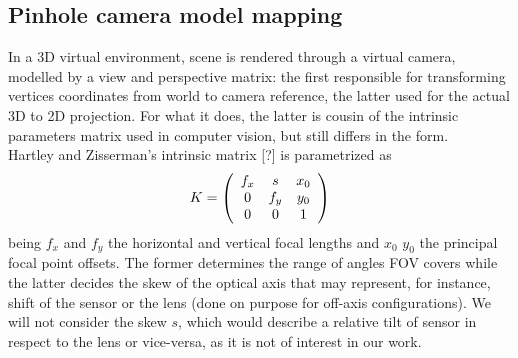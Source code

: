 \subsection{Pinhole camera model mapping}
In a 3D virtual environment, scene is rendered through a virtual camera, modelled by a view and perspective matrix: the first responsible for transforming vertices coordinates from world to camera reference, the latter used for the actual 3D to 2D projection. For what it does, the latter is cousin of the intrinsic parameters matrix used in computer vision, but still differs in the form.\\
Hartley and Zisserman's intrinsic matrix [?] is parametrized as
\begin{equation}
	K = \left ( 
    		\begin{array}{ c c c}
    		f_x & s   & x_0 \\
    		0  & f_y & y_0 \\
    		0  & 0   & 1 \\
    		\end{array}
    \right )
\label{hz_intrinsic_matrix_original}
\end{equation}
being $f_{x}$ and $f_{y}$ the horizontal and vertical focal lengths and $x_{0}$ $y_{0}$ the principal focal point offsets. The former determines the range of angles FOV covers while the latter decides the skew of the optical axis that may represent, for instance, shift of the sensor or the lens (done on purpose for off-axis configurations). We will not consider the skew $s$, which would describe a relative tilt of sensor in respect to the lens or vice-versa, as it is not of interest in our work.

